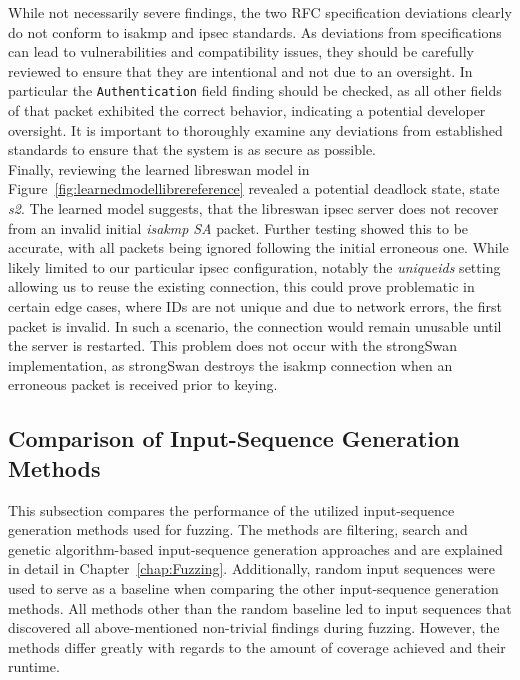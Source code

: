 While not necessarily severe findings, the two RFC specification deviations clearly do not conform to \ac{isakmp} and \ac{ipsec} standards. As deviations from specifications can lead to vulnerabilities and compatibility issues, they should be carefully reviewed to ensure that they are intentional and not due to an oversight. In particular the \texttt{Authentication} field finding should be checked, as all other fields of that packet exhibited the correct behavior, indicating a potential developer oversight. It is important to thoroughly examine any deviations from established standards to ensure that the system is as secure as possible. \\

Finally, reviewing the learned libreswan model in Figure~\ref{fig:learnedmodellibrereference} revealed a potential deadlock state, state \emph{s2}. The learned model suggests, that the libreswan \ac{ipsec} server does not recover from an invalid initial \emph{\ac{isakmp} SA} packet. Further testing showed this to be accurate, with all packets being ignored following the initial erroneous one. While likely limited to our particular \ac{ipsec} configuration, notably the \emph{uniqueids} setting allowing us to reuse the existing connection, this could prove problematic in certain edge cases, where IDs are not unique and due to network errors, the first packet is invalid. In such a scenario, the connection would remain unusable until the server is restarted. This problem does not occur with the strongSwan implementation, as strongSwan destroys the \ac{isakmp} connection when an erroneous packet is received prior to keying.
\newpage
\subsection{Comparison of Input-Sequence Generation Methods} \label{subsec:mutation_vs_filtering}
This subsection compares the performance of the utilized input-sequence generation methods used for fuzzing. The methods are filtering, search and genetic algorithm-based input-sequence generation approaches and are explained in detail in Chapter~\ref{chap:Fuzzing}. Additionally, random input sequences were used to serve as a baseline when comparing the other input-sequence generation methods. All methods other than the random baseline led to input sequences that discovered all above-mentioned non-trivial findings during fuzzing. However, the methods differ greatly with regards to the amount of coverage achieved and their runtime. \\

